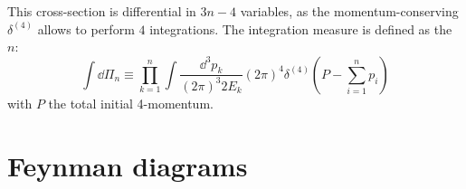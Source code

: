 This cross-section is differential in $ 3n - 4 $ variables, as the momentum-conserving $ \delta^{(4)} $ allows to perform $ 4 $ integrations. The integration measure is defined as the  $ n $:
\begin{equation}
  \int \dd \Pi_n \equiv \prod_{k = 1}^n \int \frac{\dd^3p_k}{(2\pi)^3 2E_k} (2\pi)^4 \delta^{(4)}(P - \textstyle\sum_{i = 1}^n p_i)
\end{equation}
with $ P $ the total initial 4-momentum.

\section{Feynman diagrams}
